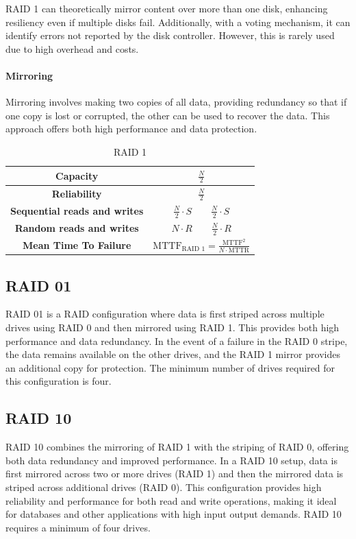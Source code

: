 RAID 1 can theoretically mirror content over more than one disk, enhancing resiliency even if multiple disks fail. 
Additionally, with a voting mechanism, it can identify errors not reported by the disk controller. 
However, this is rarely used due to high overhead and costs.

\paragraph*{Mirroring}
Mirroring involves making two copies of all data, providing redundancy so that if one copy is lost or corrupted, the other can be used to recover the data.
This approach offers both high performance and data protection.
\begin{table}[H]
    \centering
    \begin{tabular}{|cc|}
    \hline
    \textbf{Capacity}                    & $\frac{N}{2}$                                                          \\ \hline
    \textbf{Reliability}                 & $\frac{N}{2}$                                                          \\ \hline
    \textbf{Sequential reads and writes} & $\frac{N}{2}\cdot S \qquad \frac{N}{2}\cdot S$                         \\ \hline
    \textbf{Random reads and writes}     & $N\cdot R \qquad \frac{N}{2}\cdot R$                                   \\ \hline
    \textbf{Mean Time To Failure}        & $\text{MTTF}_{\text{RAID }1}=\frac{\text{MTTF}^2}{N\cdot \text{MTTR}}$ \\ \hline
    \end{tabular}
    \caption{RAID 1}
\end{table}

\subsection{RAID 01}
RAID 01 is a RAID configuration where data is first striped across multiple drives using RAID 0 and then mirrored using RAID 1.
This provides both high performance and data redundancy. 
In the event of a failure in the RAID 0 stripe, the data remains available on the other drives, and the RAID 1 mirror provides an additional copy for protection. 
The minimum number of drives required for this configuration is four.

\subsection{RAID 10}
RAID 10 combines the mirroring of RAID 1 with the striping of RAID 0, offering both data redundancy and improved performance. 
In a RAID 10 setup, data is first mirrored across two or more drives (RAID 1) and then the mirrored data is striped across additional drives (RAID 0). 
This configuration provides high reliability and performance for both read and write operations, making it ideal for databases and other applications with high input output demands. 
RAID 10 requires a minimum of four drives.
